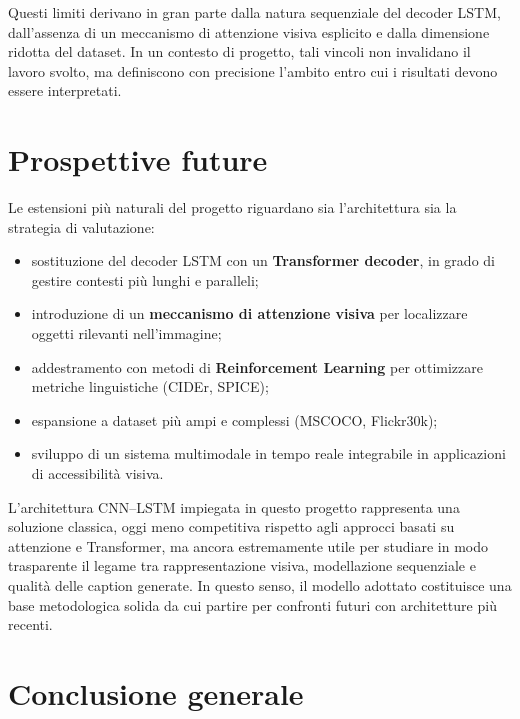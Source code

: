 \documentclass[11pt,a4paper]{report}
\begin{document}
\begin{tcolorbox}[title=Analisi critica]
Questi limiti derivano in gran parte dalla natura sequenziale del decoder LSTM, dall'assenza di un meccanismo di attenzione visiva esplicito e dalla dimensione ridotta del dataset. In un contesto di progetto, tali vincoli non invalidano il lavoro svolto, ma definiscono con precisione l'ambito entro cui i risultati devono essere interpretati.
\end{tcolorbox}

\section{Prospettive future}

Le estensioni più naturali del progetto riguardano sia l'architettura sia la strategia di valutazione:
\begin{itemize}
  \item sostituzione del decoder LSTM con un \textbf{Transformer decoder}, in grado di gestire contesti più lunghi e paralleli;
  \item introduzione di un \textbf{meccanismo di attenzione visiva} per localizzare oggetti rilevanti nell’immagine;
  \item addestramento con metodi di \textbf{Reinforcement Learning} per ottimizzare metriche linguistiche (CIDEr, SPICE);
  \item espansione a dataset più ampi e complessi (MSCOCO, Flickr30k);
  \item sviluppo di un sistema multimodale in tempo reale integrabile in applicazioni di accessibilità visiva.
\end{itemize}

\begin{tcolorbox}[title=Confronto concettuale con modelli più recenti]
L'architettura CNN--LSTM impiegata in questo progetto rappresenta una soluzione classica, oggi meno competitiva rispetto agli approcci basati su attenzione e Transformer, ma ancora estremamente utile per studiare in modo trasparente il legame tra rappresentazione visiva, modellazione sequenziale e qualità delle caption generate. In questo senso, il modello adottato costituisce una base metodologica solida da cui partire per confronti futuri con architetture più recenti.
\end{tcolorbox}

\section{Conclusione generale}
\end{document}
